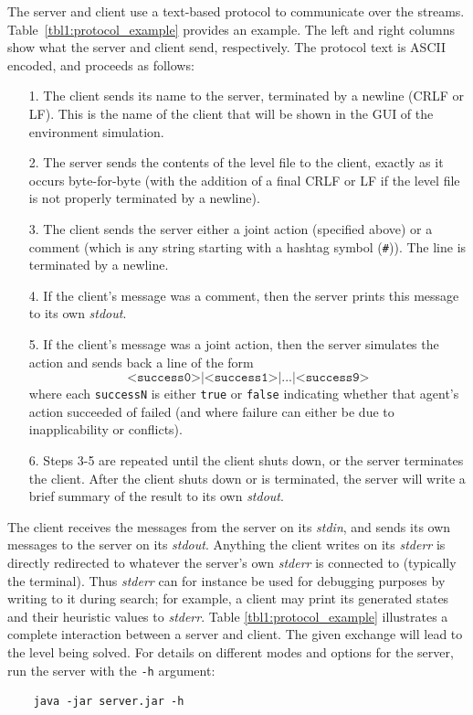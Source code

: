 \documentclass[12pt,a4paper]{article}
\begin{document}
The server and client use a text-based protocol to communicate over the streams. Table~\ref{tbl1:protocol_example} provides an example. The left and right columns show what the server and client send, respectively. The protocol text is ASCII encoded, and proceeds as follows: 
\begin{enumerate}
\item[1.] The client sends its name to the server, terminated by a newline (CRLF or LF). This is the name of the client that will be shown in the GUI of the environment simulation.
\item[2.] The server sends the contents of the level file to the client, exactly as it occurs byte-for-byte (with the addition of a final CRLF or LF if the level file is not properly terminated by a newline).
\item[3.] The client sends the server either a joint action (specified above) or a comment (which is any string starting with a hashtag symbol (\texttt{\#})). The line is terminated by a newline.
\item[4.] If the client's message was a comment, then the server prints this message to its own \emph{stdout}.
\item[5.] If the client's message was a joint action, then the server simulates the action and sends back a line of the form
\[
   \texttt{<success0>|<success1>|...|<success9>}
\]
where each \texttt{successN} is either \texttt{true} or \texttt{false} indicating whether that agent's action succeeded of failed (and where failure can either be due to inapplicability or conflicts).
\item[6.] Steps 3-5 are repeated until the client shuts down, or the server terminates the client. After the client shuts down or is terminated, the server will write a brief summary of the result to its own \emph{stdout}.
\end{enumerate}

The client receives the messages from the server on its \emph{stdin}, and sends its own messages to the server on its \emph{stdout}. Anything the client writes on its \emph{stderr} is directly redirected to whatever the server's own \emph{stderr} is connected to (typically the terminal). Thus \emph{stderr} can for instance be used for debugging purposes by writing to it during search; for example, a client may print its generated states and their heuristic values to \emph{stderr}. Table \ref{tbl1:protocol_example} illustrates a complete interaction between a server and client. The given exchange will lead to the level being solved. For details on different modes and options for the server, run the server with the \texttt{-h} argument:
\begin{verbatim}
    java -jar server.jar -h
\end{verbatim}
\end{document}

